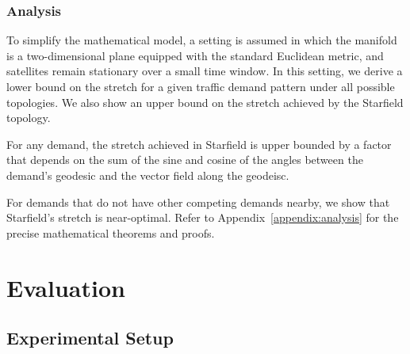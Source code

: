 \documentclass[acmsmall, screen]{acmart}
\begin{document}
\subsubsection{Analysis}
To simplify the mathematical model, a setting is assumed in which the manifold is a two-dimensional plane equipped with the standard Euclidean metric, and satellites remain stationary over a small time window. In this setting, we derive a lower bound on the stretch for a given traffic demand pattern under all possible topologies. We also show an upper bound on the stretch achieved by the Starfield topology.
\begin{theorem}[informal]
For any demand, the stretch achieved in Starfield is upper bounded by a factor that depends on the sum of the sine and cosine of the angles between the demand's geodesic and the vector field along the geodeisc. 
\end{theorem}
For demands that do not have other competing demands nearby, we show that Starfield's stretch is near-optimal. Refer to Appendix~\ref{appendix:analysis} for the precise mathematical theorems and proofs.

\section{Evaluation}\label{evaluation}
\subsection{Experimental Setup}\label{evaluation:setup}
\end{document}

